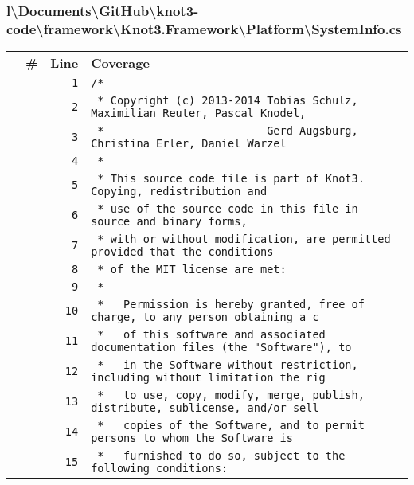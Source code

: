 \documentclass[a4paper,10pt]{article}
\begin{document}
\subsubsection{l\textbackslash Documents\textbackslash GitHub\textbackslash knot3-code\textbackslash framework\textbackslash Knot3.Framework\textbackslash Platform\textbackslash SystemInfo.cs}
\begin{longtable}[l]{lrrl}
\textbf{} & \textbf{\#} & \textbf{Line} & \textbf{Coverage}\\
\cellcolor{gray} &  & \verb~1~ & \verb~/*~\\
\cellcolor{gray} &  & \verb~2~ & \verb~ * Copyright (c) 2013-2014 Tobias Schulz, Maximilian Reuter, Pascal Knodel,~\\
\cellcolor{gray} &  & \verb~3~ & \verb~ *                         Gerd Augsburg, Christina Erler, Daniel Warzel~\\
\cellcolor{gray} &  & \verb~4~ & \verb~ *~\\
\cellcolor{gray} &  & \verb~5~ & \verb~ * This source code file is part of Knot3. Copying, redistribution and~\\
\cellcolor{gray} &  & \verb~6~ & \verb~ * use of the source code in this file in source and binary forms,~\\
\cellcolor{gray} &  & \verb~7~ & \verb~ * with or without modification, are permitted provided that the conditions~\\
\cellcolor{gray} &  & \verb~8~ & \verb~ * of the MIT license are met:~\\
\cellcolor{gray} &  & \verb~9~ & \verb~ *~\\
\cellcolor{gray} &  & \verb~10~ & \verb~ *   Permission is hereby granted, free of charge, to any person obtaining a c~\\
\cellcolor{gray} &  & \verb~11~ & \verb~ *   of this software and associated documentation files (the "Software"), to ~\\
\cellcolor{gray} &  & \verb~12~ & \verb~ *   in the Software without restriction, including without limitation the rig~\\
\cellcolor{gray} &  & \verb~13~ & \verb~ *   to use, copy, modify, merge, publish, distribute, sublicense, and/or sell~\\
\cellcolor{gray} &  & \verb~14~ & \verb~ *   copies of the Software, and to permit persons to whom the Software is~\\
\cellcolor{gray} &  & \verb~15~ & \verb~ *   furnished to do so, subject to the following conditions:~\\

\end{longtable}
\end{document}
